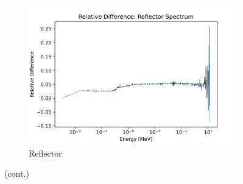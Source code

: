 \begin{figure}[H]\ContinuedFloat
\centering

\begin{subfigure}{0.95\textwidth}
  \includegraphics[width=0.95\linewidth]{figures/reldiff_reflec_spec_er}
  \caption{Reflector}
  \label{fig:diff-reflec}
\end{subfigure}%

\caption[]{(cont.)}
\label{fig:diff-spec}
\end{figure}